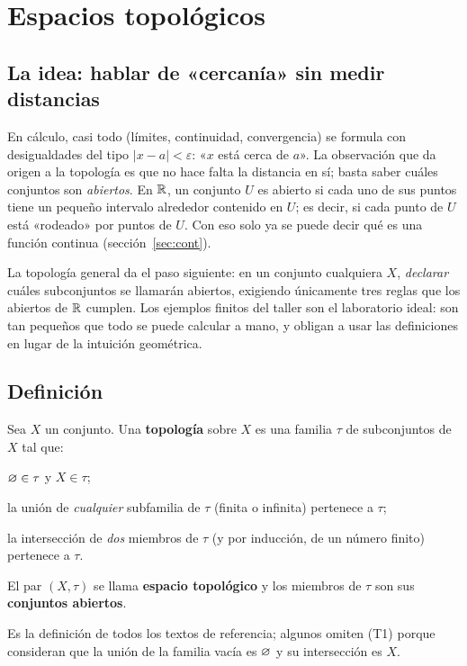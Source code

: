 \section{Espacios topológicos}

\subsection{La idea: hablar de «cercanía» sin medir distancias}
En cálculo, casi todo (límites, continuidad, convergencia) se formula con desigualdades del tipo $|x-a|<\varepsilon$:
«$x$ está cerca de $a$». La observación que da origen a la topología es que no hace falta la distancia en sí; basta
saber cuáles conjuntos son \emph{abiertos}. En $\mathbb{R}$, un conjunto $U$ es abierto si cada uno de sus puntos tiene un
pequeño intervalo alrededor contenido en $U$; es decir, si cada punto de $U$ está «rodeado» por puntos de $U$.
Con eso solo ya se puede decir qué es una función continua (sección~\ref{sec:cont}).

La topología general da el paso siguiente: en un conjunto cualquiera $X$, \emph{declarar} cuáles subconjuntos se
llamarán abiertos, exigiendo únicamente tres reglas que los abiertos de $\mathbb{R}$ cumplen. Los ejemplos finitos del taller
son el laboratorio ideal: son tan pequeños que todo se puede calcular a mano, y obligan a usar las definiciones en
lugar de la intuición geométrica.

\subsection{Definición}
\begin{definicion}
Sea $X$ un conjunto. Una \textbf{topología} sobre $X$ es una familia $\tau$ de subconjuntos de $X$ tal que:
\begin{description}[leftmargin=1.4cm,labelwidth=1.0cm,itemsep=0.1em]
\item[(T1)] $\varnothing\in\tau$ y $X\in\tau$;
\item[(T2)] la unión de \emph{cualquier} subfamilia de $\tau$ (finita o infinita) pertenece a $\tau$;
\item[(T3)] la intersección de \emph{dos} miembros de $\tau$ (y por inducción, de un número finito) pertenece a $\tau$.
\end{description}
El par $(X,\tau)$ se llama \textbf{espacio topológico} y los miembros de $\tau$ son sus \textbf{conjuntos abiertos}.
\end{definicion}
Es la definición de todos los textos de referencia; algunos omiten (T1) porque consideran que la unión de
la familia vacía es $\varnothing$ y su intersección es $X$.

